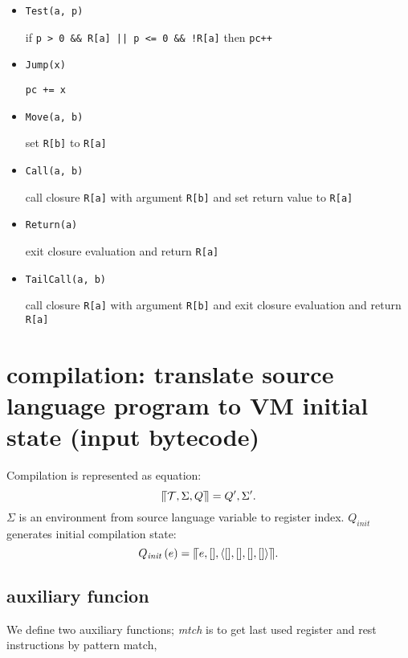 \documentclass{article}
\begin{document}
\begin{minipage}{\textwidth}
    \begin{multicols}{2}
        \begin{itemize}
            \item \texttt{Test(a, p)}

                if \texttt{p > 0 \&\& R[a] || p <= 0 \&\& !R[a]} then \texttt{pc++}

            \item \texttt{Jump(x)}

                \texttt{pc += x}
            \item \texttt{Move(a, b)}

                set \texttt{R[b]} to \texttt{R[a]}
            \item \texttt{Call(a, b)}

                call closure \texttt{R[a]} with argument \texttt{R[b]} and set return value to \texttt{R[a]}
            \item \texttt{Return(a)}

                exit closure evaluation and return \texttt{R[a]}
            \item \texttt{TailCall(a, b)}

                call closure \texttt{R[a]} with argument \texttt{R[b]} and exit closure evaluation and return \texttt{R[a]}
        \end{itemize}
    \end{multicols}
\end{minipage}

\section{compilation: translate source language program to VM initial state (input bytecode)}
Compilation is represented as equation: \[\llceil\mathcal{T}, \Sigma, Q\rrceil = Q', \Sigma' .\]
$\Sigma$ is an environment from source language variable to register index.
$Q_{\mathit{init}}$ generates initial compilation state: \[Q_{\mathit{init}}\left(e\right) = \llceil e, [], \left\langle [], [], [], []\right\rangle \rrceil .\]

\subsection{auxiliary funcion}
We define two auxiliary functions; \textit{mtch} is to get last used register and rest instructions by pattern match, 
\end{document}
